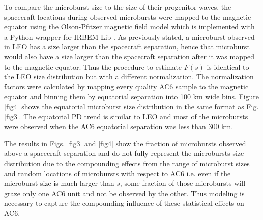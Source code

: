 \documentclass[draft]{agujournal2019}
\begin{document}
To compare the microburst size to the size of their progenitor waves, the spacecraft locations during observed microbursts were mapped to the magnetic equator using the Olson-Pfitzer magnetic field model \cite{Olson1982} which is implemented with a Python wrapper for IRBEM-Lib \cite{irbem}. As previously stated, a microburst observed in LEO has a size larger than the spacecraft separation, hence that microburst would also have a size larger than the spacecraft separation after it was mapped to the magnetic equator. Thus the procedure to estimate $F(s)$ is identical to the LEO size distribution but with a different normalization. The normalization factors were calculated by mapping every quality AC6 sample to the magnetic equator and binning them by equatorial separation into 100 km wide bins. Figure \ref{fig4} shows the equatorial microburst size distribution in the same format as Fig. \ref{fig3}. The equatorial PD trend is similar to LEO and most of the microbursts were observed when the AC6 equatorial separation was less than 300 km. 

The results in Figs. \ref{fig3} and \ref{fig4} show the fraction of microbursts observed above a spacecraft separation and do not fully represent the microbursts size distribution due to the compounding effects from the range of microburst sizes and random locations of microbursts with respect to AC6 i.e. even if the microburst size is much larger than $s$, some fraction of those microbursts will graze only one AC6 unit and not be observed by the other. Thus modeling is necessary to capture the compounding influence of these statistical effects on AC6.
\end{document}
